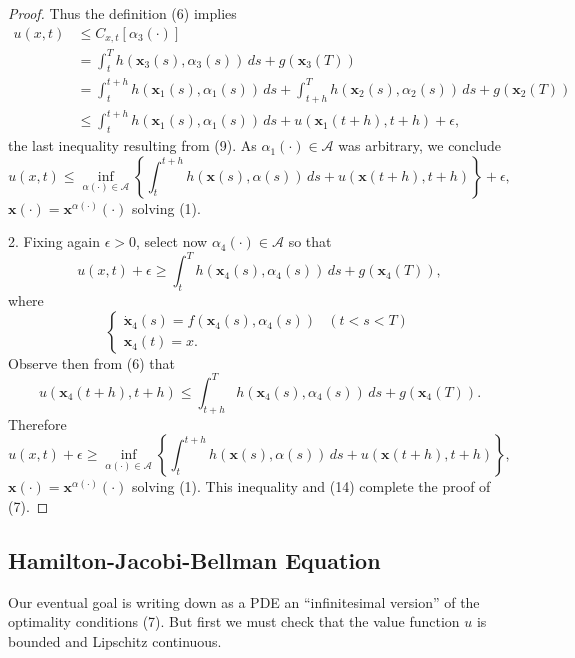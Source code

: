 \begin{proof}
Thus the definition (6) implies
\[
\begin{aligned}
u(x,t) &\le C_{x,t}[\alpha_3(\cdot)] \\
&= \int_t^T h(\mathbf{x}_3(s), \alpha_3(s)) \, ds + g(\mathbf{x}_3(T)) \\
&= \int_t^{t+h} h(\mathbf{x}_1(s), \alpha_1(s)) \, ds + \int_{t+h}^T h(\mathbf{x}_2(s), \alpha_2(s)) \, ds + g(\mathbf{x}_2(T)) \\
&\le \int_t^{t+h} h(\mathbf{x}_1(s), \alpha_1(s)) \, ds + u(\mathbf{x}_1(t+h), t+h) + \epsilon,
\end{aligned}
\]
the last inequality resulting from (9). As $\alpha_1(\cdot) \in \mathcal{A}$ was arbitrary, we conclude
\[
u(x,t) \le \inf_{\alpha(\cdot) \in \mathcal{A}} \left\{ \int_t^{t+h} h(\mathbf{x}(s), \alpha(s)) \, ds + u(\mathbf{x}(t+h), t+h) \right\} + \epsilon,
\tag{14}
\]
$\mathbf{x}(\cdot) = \mathbf{x}^{\alpha(\cdot)}(\cdot)$ solving (1).

2. Fixing again $\epsilon > 0$, select now $\alpha_4(\cdot) \in \mathcal{A}$ so that
\[
u(x,t) + \epsilon \geq \int_t^T h(\mathbf{x}_4(s), \alpha_4(s)) \, ds + g(\mathbf{x}_4(T)),
\tag{15}
\]
where
\[
\begin{cases}
\dot{\mathbf{x}}_4(s) = f(\mathbf{x}_4(s), \alpha_4(s)) & (t < s < T) \\
\mathbf{x}_4(t) = x.
\end{cases}
\]
Observe then from (6) that
\[
u(\mathbf{x}_4(t+h), t+h) \le \int_{t+h}^T h(\mathbf{x}_4(s), \alpha_4(s)) \, ds + g(\mathbf{x}_4(T)).
\tag{16}
\]
Therefore
\[
u(x,t) + \epsilon \geq \inf_{\alpha(\cdot) \in \mathcal{A}} \left\{ \int_t^{t+h} h(\mathbf{x}(s), \alpha(s)) \, ds + u(\mathbf{x}(t+h), t+h) \right\},
\]
$\mathbf{x}(\cdot) = \mathbf{x}^{\alpha(\cdot)}(\cdot)$ solving (1). This inequality and (14) complete the proof of (7).
\end{proof}

\subsection{Hamilton-Jacobi-Bellman Equation}

Our eventual goal is writing down as a PDE an ``infinitesimal version'' of the optimality conditions (7). But first we must check that the value function $u$ is bounded and Lipschitz continuous.

